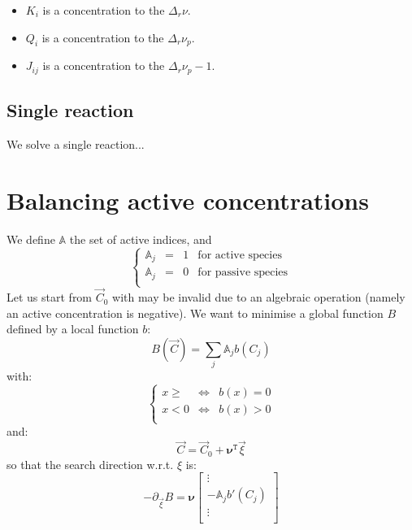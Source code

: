 \documentclass[aps,12pt]{revtex4}
\newcommand{\trn}[1]{{#1}^{\mathtt{T}}}
\begin{document}
\begin{itemize}
\item $K_i$ is a concentration to the $\Delta_r \nu$.
\item $Q_i$ is a concentration to the $\Delta_r \nu_p$.
\item $J_{ij}$ is a concentration to the $\Delta_r \nu_p-1$.
\end{itemize}

\subsection{Single reaction}
We solve a single reaction...

\section{Balancing active concentrations}
We define $\mathbb{A}$ the set of active indices, and 
\begin{equation}
\left\lbrace
\begin{array}{rccl}
\mathbb{A}_j & = & 1  & \text{for active species}\\
\mathbb{A}_j & = & 0  & \text{for passive species}\\
\end{array}
\right.
\end{equation}
Let us start from $\vec{C}_0$ with may be invalid due to an algebraic operation (namely an active concentration is negative).
We want to minimise a global function $B$ defined by a local function $b$:
\begin{equation}
	B(\vec{C}) = \sum_{j } \mathbb{A}_j b(C_j) 
\end{equation}
with:
\begin{equation}
\left\lbrace
\begin{array}{rcl}
	x\geq & \Leftrightarrow & b(x) = 0\\
	x<0   & \Leftrightarrow & b(x) > 0\\
\end{array}
\right.
\end{equation}
and:
\begin{equation}
	\vec{C}=\vec{C}_0 + \trn{\bm{\nu}} \vec{\xi}
\end{equation}
so that the search direction w.r.t. $\xi$ is:
\begin{equation}
	-\partial_{\vec{\xi}} B = \bm{\nu}
	\begin{bmatrix}
		\vdots\\
		-\mathbb{A}_j b'(C_j)\\
		\vdots\\
	\end{bmatrix}
\end{equation}
\end{document}
